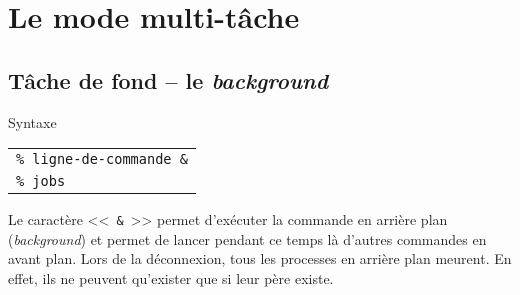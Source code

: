 %
%

\setcounter{remarque-cnt}{1}
\setcounter{example-cnt}{1}
\chapter{\label{multitask}Le mode multi-t{\^a}che}
\thispagestyle{fancy}

\section{\texorpdfstring{T{\^a}che de fond -- le {\sl background}}{T{\^a}che de fond -- le background}}

\begin{definition}{Syntaxe}
\begin{tabular}{@{\hspace{1cm}}l}
	{\tt \% ligne-de-commande \&}\\[0.2cm]
	{\tt \% jobs}\\[0.2cm]
\end{tabular}
\end{definition}

Le caract{\`e}re <<~\verb=&=~>> permet
d'ex{\'e}cuter la commande en arri{\`e}re plan (\textsl{background}) et
permet de lancer pendant ce temps l{\`a} d'autres commandes en avant
plan. Lors de la d{\'e}connexion, tous les processes en arri{\`e}re plan
meurent. En effet, ils ne peuvent qu'exister que si leur p{\`e}re
existe.

